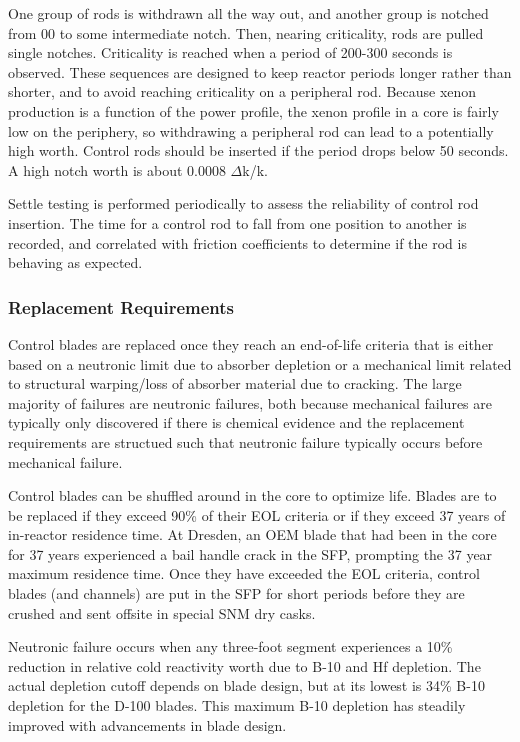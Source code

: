 \documentclass[10pt]{article}
\newcounter{subsubsubsection}[subsubsection]
\begin{document}
One group of rods is withdrawn all the way out, and another group is notched from 00 to some intermediate notch. Then, nearing criticality, rods are pulled single notches. Criticality is reached when a period of 200-300 seconds is observed. These sequences are designed to keep reactor periods longer rather than shorter, and to avoid reaching criticality on a peripheral rod. Because xenon production is a function of the power profile, the xenon profile in a core is fairly low on the periphery, so withdrawing a peripheral rod can lead to a potentially high worth. Control rods should be inserted if the period drops below 50 seconds. A high notch worth is about 0.0008 \(\Delta\)k/k. 


Settle testing is performed periodically to assess the reliability of control rod insertion. The time for a control rod to fall from one position to another is recorded, and correlated with friction coefficients to determine if the rod is behaving as expected. 

\subsubsection{Replacement Requirements}
Control blades are replaced once they reach an end-of-life criteria that is either based on a neutronic limit due to absorber depletion or a mechanical limit related to structural warping/loss of absorber material due to cracking. The large majority of failures are neutronic failures, both because mechanical failures are typically only discovered if there is chemical evidence and the replacement requirements are structued such that neutronic failure typically occurs before mechanical failure.

Control blades can be shuffled around in the core to optimize life. Blades are to be replaced if they exceed 90\% of their EOL criteria or if they exceed 37 years of in-reactor residence time. At Dresden, an OEM blade that had been in the core for 37 years experienced a bail handle crack in the SFP, prompting the 37 year maximum residence time. Once they have exceeded the EOL criteria, control blades (and channels) are put in the SFP for short periods before they are crushed and sent offsite in special SNM dry casks. 

Neutronic failure occurs when any three-foot segment experiences a 10\% reduction in relative cold reactivity worth due to B-10 and Hf depletion.  The actual depletion cutoff depends on blade design, but at its lowest is 34\% B-10 depletion for the D-100 blades. This maximum B-10 depletion has steadily improved with advancements in blade design. 
\end{document}
